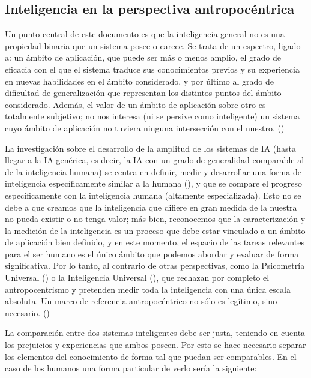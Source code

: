 \subsection{Inteligencia en la perspectiva antropocéntrica}

Un punto central de este documento es que la inteligencia general no es una propiedad binaria que un sistema posee o carece. Se trata de un espectro, ligado a: un ámbito de aplicación, que puede ser más o menos amplio, el grado de eficacia con el que el sistema traduce sus conocimientos previos y su experiencia en nuevas habilidades en el ámbito considerado, y por último al grado de dificultad de generalización que representan los distintos puntos del ámbito considerado. Además, el valor de un ámbito de aplicación sobre otro es totalmente subjetivo; no nos interesa (ni se persive como inteligente) un sistema cuyo ámbito de aplicación no tuviera ninguna intersección con el nuestro. (\cite{chollet2019measure})

La investigación sobre el desarrollo de la amplitud de los sistemas de IA (hasta llegar a la IA genérica, es decir, la IA con un grado de generalidad comparable al de la inteligencia humana) se centra en definir, medir y desarrollar una forma de inteligencia específicamente similar a la humana (\cite{goertzel2012architecture}), y que se compare el progreso específicamente con la inteligencia humana (altamente especializada). Esto no se debe a que creamos que la inteligencia que difiere en gran medida de la nuestra no pueda existir o no tenga valor; más bien, reconocemos que la caracterización y la medición de la inteligencia es un proceso que debe estar vinculado a un ámbito de aplicación bien definido, y en este momento, el espacio de las tareas relevantes para el ser humano es el único ámbito que podemos abordar y evaluar de forma significativa. Por lo tanto, al contrario de otras perspectivas, como la Psicometría Universal (\cite{hernandez2014universal}) o la Inteligencia Universal (\cite{legg2007universal}), que rechazan por completo el antropocentrismo y pretenden medir toda la inteligencia con una única escala absoluta. Un marco de referencia antropocéntrico no sólo es legítimo, sino necesario. (\cite{chollet2019measure})

La comparación entre dos sistemas inteligentes debe ser justa, teniendo en cuenta los prejuicios y experiencias que ambos poseen. Por esto se hace necesario separar los elementos del conocimiento de forma tal que puedan ser comparables. En el caso de los humanos una forma particular de verlo sería la siguiente:

